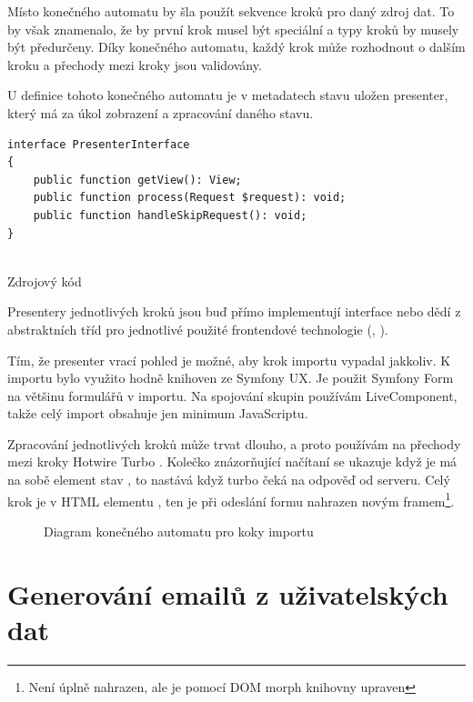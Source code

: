 Místo konečného automatu by šla použít sekvence kroků pro daný zdroj dat. To by však znamenalo, že by první krok musel být speciální a typy kroků by musely být předurčeny. Díky konečného automatu, každý krok může rozhodnout o dalším kroku a přechody mezi kroky jsou validovány.

U definice tohoto konečného automatu je v metadatech stavu uložen presenter, který má za úkol zobrazení a zpracování daného stavu. 

\begin{code}
  \begin{verbatim}
interface PresenterInterface
{
    public function getView(): View;
    public function process(Request $request): void;
    public function handleSkipRequest(): void;
}
 
    \end{verbatim}
    \caption{Zdrojový kód }

\end{code}


Presentery jednotlivých kroků jsou buď přímo implementují interface nebo dědí z abstraktních tříd
pro jednotlivé použité frontendové technologie (, ).

Tím, že presenter vrací pohled je možné, aby krok importu vypadal jakkoliv.
K importu bylo využito hodně knihoven ze Symfony UX.
Je použit Symfony Form na většinu formulářů v importu.
Na spojování skupin používám LiveComponent, takže celý import obsahuje jen minimum JavaScriptu.

Zpracování jednotlivých kroků může trvat dlouho, a proto používám na přechody mezi kroky Hotwire Turbo .
Kolečko znázorňující načítaní se ukazuje když je má na sobě element  stav , to nastává když turbo čeká na odpověď od serveru.
Celý krok je v HTML elementu , ten je při odeslání formu nahrazen novým framem\footnote{Není úplně nahrazen, ale je pomocí DOM morph knihovny upraven}.


\clearpage

\begin{figure}
	\centering
\resizebox{!}{0.95\textheight}{\huge{}}
  \caption{Diagram konečného automatu pro koky importu}
  \label{postup:import-diagram}
\end{figure}


\clearpage

\section{Generování emailů z uživatelských dat}

